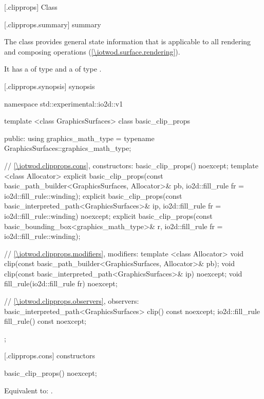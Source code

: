 
 [\iotwod.clipprops] {Class }

 [\iotwod.clipprops.summary] { summary}

\pnum
The  class provides general state information that is applicable to all rendering and composing operations (\ref{\iotwod.surface.rendering}).

\pnum
It has a  of type  and a  of type .

 [\iotwod.clipprops.synopsis] { synopsis}

\begin{codeblock}
namespace std::experimental::io2d::v1 {
  template <class GraphicsSurfaces>
  class basic_clip_props {
  public:
    using graphics_math_type = typename GraphicsSurfaces::graphics_math_type;

    // \ref{\iotwod.clipprops.cons}, constructors:
    basic_clip_props() noexcept;
    template <class Allocator>
    explicit basic_clip_props(const basic_path_builder<GraphicsSurfaces, Allocator>& pb,
      io2d::fill_rule fr = io2d::fill_rule::winding);
    explicit basic_clip_props(const basic_interpreted_path<GraphicsSurfaces>& ip,
      io2d::fill_rule fr = io2d::fill_rule::winding) noexcept;
    explicit basic_clip_props(const basic_bounding_box<graphics_math_type>& r,
      io2d::fill_rule fr = io2d::fill_rule::winding);

    // \ref{\iotwod.clipprops.modifiers}, modifiers:
    template <class Allocator>
    void clip(const basic_path_builder<GraphicsSurfaces, Allocator>& pb);
    void clip(const basic_interpreted_path<GraphicsSurfaces>& ip) noexcept;
    void fill_rule(io2d::fill_rule fr) noexcept;

    // \ref{\iotwod.clipprops.observers}, observers:
    basic_interpreted_path<GraphicsSurfaces> clip() const noexcept;
    io2d::fill_rule fill_rule() const noexcept;
  };
}
\end{codeblock}

 [\iotwod.clipprops.cons] { constructors}

%
\begin{itemdecl}
basic_clip_props() noexcept;
\end{itemdecl}
\begin{itemdescr}
\pnum
\effects
Equivalent to: .
\end{itemdescr}

